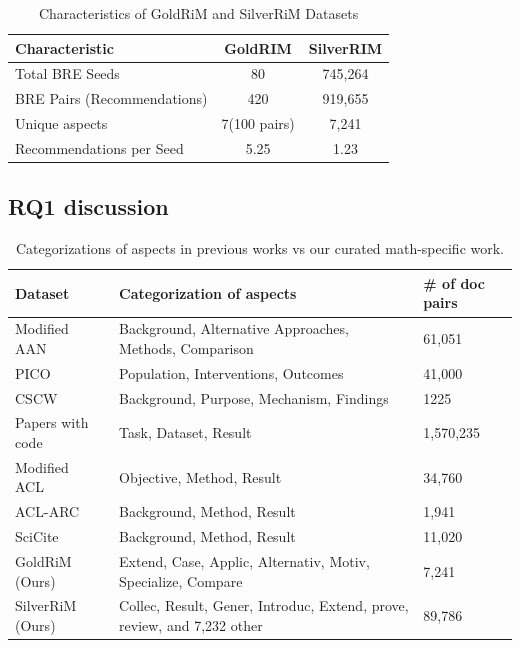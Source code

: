 \documentclass[sigconf,anonymous]{acmart}
\begin{document}
\begin{table}[h]
\centering
\caption{Characteristics of GoldRiM and SilverRiM Datasets}
\label{tab:dataset_characteristics}
\begin{tabular}{lcc}
\hline
\textbf{Characteristic} & \textbf{GoldRIM} & \textbf{SilverRIM} \\
\hline
Total BRE Seeds & 80 & 745,264 \\
BRE Pairs (Recommendations) & 420 & 919,655 \\
Unique aspects & 7(100 pairs) & 7,241 \\
Recommendations per Seed & 5.25 & 1.23 \\
\hline
\end{tabular}
\end{table}

\subsection{RQ1 discussion}

\begin{table}[h]
\centering
\caption{Categorizations of aspects in previous works vs our curated math-specific work.}
\label{tab:aspects}
\begin{tabular}{lll}
\hline
Dataset & Categorization of aspects & \# of doc pairs\\
\hline
Modified AAN~\cite{chakraborty2016ferosa} & Background, Alternative Approaches, Methods, Comparison & 61,051\\
PICO~\cite{jain2018PICObiomed} & Population, Interventions, Outcomes & 41,000\\
CSCW~\cite{chan2018solventCSCW} & Background, Purpose, Mechanism, Findings & 1225\\
Papers with code~\cite{Ostendorff2022a} & Task, Dataset, Result & 1,570,235\\
Modified ACL~\cite{kobayashi2018ACL} & Objective, Method, Result & 34,760\\
ACL-ARC~\cite{Jurgens2018ACLARC} & Background, Method, Result & 1,941\\
SciCite~\cite{cohan2019structural} & Background, Method, Result & 11,020\\
\hline
GoldRiM (Ours)& Extend, Case, Applic, Alternativ, Motiv, Specialize, Compare & 7,241\\
SilverRiM (Ours)& Collec, Result,  Gener, Introduc, Extend, prove, review, and 7,232 other & 89,786\\
\hline
\end{tabular}
\end{table}
\end{document}
